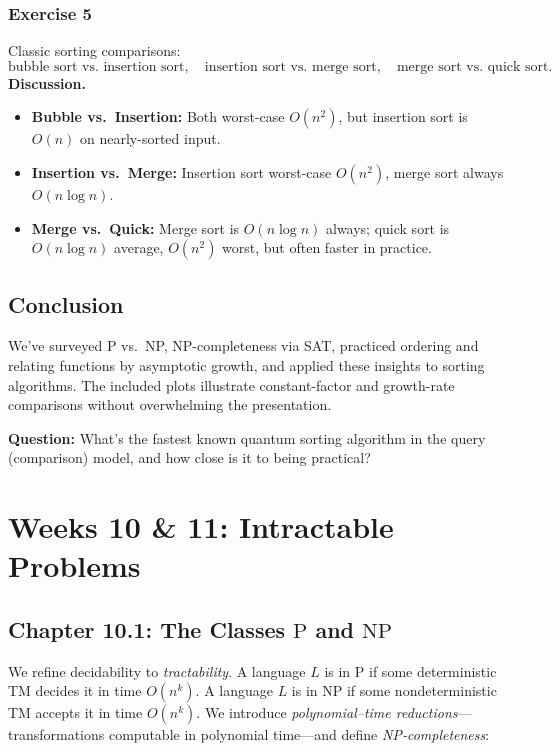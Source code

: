 \documentclass{article}
\theoremstyle{theorem}
\theoremstyle{definition}
\theoremstyle{remark}
\begin{document}
\subsubsection*{Exercise 5}
Classic sorting comparisons:
\[
\text{bubble sort vs.\ insertion sort},\quad
\text{insertion sort vs.\ merge sort},\quad
\text{merge sort vs.\ quick sort}.
\]
\textbf{Discussion.}
\begin{itemize}
  \item \textbf{Bubble vs.\ Insertion:} Both worst-case \(O(n^2)\), but insertion sort is \(O(n)\) on nearly-sorted input.
  \item \textbf{Insertion vs.\ Merge:} Insertion sort worst-case \(O(n^2)\), merge sort always \(O(n\log n)\).
  \item \textbf{Merge vs.\ Quick:} Merge sort is \(O(n\log n)\) always; quick sort is \(O(n\log n)\) average, \(O(n^2)\) worst, but often faster in practice.
\end{itemize}

\subsection{Conclusion}
We’ve surveyed P vs.\ NP, NP-completeness via SAT, practiced ordering and relating functions by asymptotic growth, and applied these insights to sorting algorithms. The included plots illustrate constant-factor and growth-rate comparisons without overwhelming the presentation.

\textbf{Question:} What’s the fastest known quantum sorting algorithm in the query (comparison) model, and how close is it to being practical?

\section{Weeks 10 \& 11: Intractable Problems}

\subsection{Chapter 10.1: The Classes \(\mathrm{P}\) and \(\mathrm{NP}\)}  
We refine decidability to \emph{tractability}.  A language \(L\) is in
\(\mathrm{P}\) if some deterministic TM decides it in time \(O(n^k)\).  A
language \(L\) is in \(\mathrm{NP}\) if some nondeterministic TM accepts
it in time \(O(n^k)\).  We introduce \emph{polynomial–time reductions}—
transformations computable in polynomial time—and define \emph{NP‐completeness}:
\end{document}
